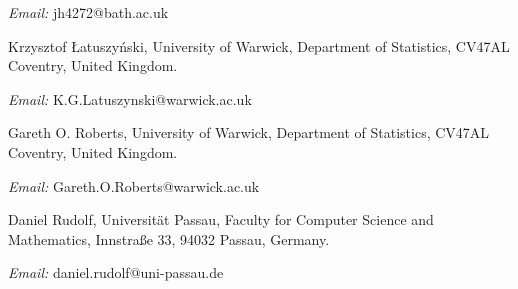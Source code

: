 \documentclass[12pt]{article}
\theoremstyle{definition}
\begin{document}
\noindent
\textit{Email:} jh4272@bath.ac.uk   


\medskip
\noindent
Krzysztof {{\L}atuszy\'{n}ski}, University of Warwick, Department of Statistics, CV47AL Coventry, United Kingdom. 

\noindent
\textit{Email:} K.G.Latuszynski@warwick.ac.uk   

\medskip
\noindent
Gareth O. Roberts, University of Warwick, Department of Statistics, CV47AL Coventry, United Kingdom. 

\noindent
\textit{Email:} Gareth.O.Roberts@warwick.ac.uk   



\medskip
\noindent
Daniel Rudolf, Universit\"at Passau, Faculty for Computer Science and Mathematics, Innstraße 33, 94032 Passau, Germany. 

\noindent
\textit{Email:} daniel.rudolf@uni-passau.de   
\end{document}

